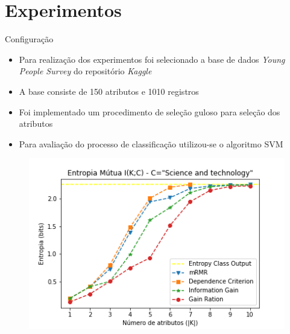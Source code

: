 \documentclass{beamer}
\begin{document}
\section{Experimentos}

\begin{frame}{Configuração}
	\begin{itemize}
		\item Para realização dos experimentos foi selecionado a base de dados \textit{Young People Survey} do repositório \textit{Kaggle}
		\item A base consiste de 150 atributos e 1010 registros
		\item Foi implementado um procedimento de seleção guloso para seleção dos atributos
		\item Para avaliação do processo de classificação utilizou-se o algoritmo SVM
	\end{itemize}
\end{frame}


\begin{frame}
	\begin{figure}[ht]
		\begin{center}
 	 	  \includegraphics[scale=0.7]{figuras/Entropy_Science_and_technology.png}	
		  \label{fig:fluxogramaAG}		
		\end{center}
	\end{figure}
\end{frame}
\end{document}
